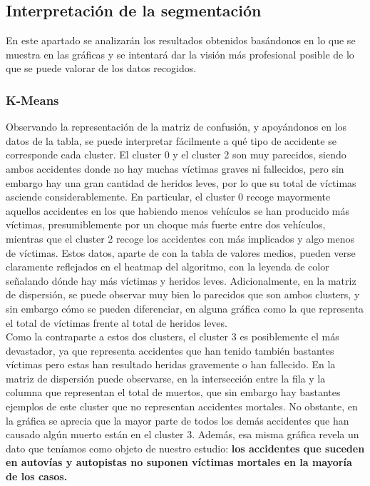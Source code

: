 	\subsection{Interpretación de la segmentación}
	En este apartado se analizarán los resultados obtenidos basándonos en lo que se muestra en las gráficas y se intentará dar la visión más profesional posible de lo que se puede valorar de los datos recogidos.\\
	
	\subsubsection{K-Means}
	Observando la representación de la matriz de confusión, y apoyándonos en los datos de la tabla, se puede interpretar fácilmente a qué tipo de accidente se corresponde cada cluster. El cluster 0 y el cluster 2 son muy parecidos, siendo ambos accidentes donde no hay muchas víctimas graves ni fallecidos, pero sin embargo hay una gran cantidad de heridos leves, por lo que su total de víctimas asciende considerablemente. En particular, el cluster 0 recoge mayormente aquellos accidentes en los que habiendo menos vehículos se han producido más víctimas, presumiblemente por un choque más fuerte entre dos vehículos, mientras que el cluster 2 recoge los accidentes con más implicados y algo menos de víctimas. Estos datos, aparte de con la tabla de valores medios, pueden verse claramente reflejados en el heatmap del algoritmo, con la leyenda de color señalando dónde hay más víctimas y heridos leves. Adicionalmente, en la matriz de dispersión, se puede observar muy bien lo parecidos que son ambos clusters, y sin embargo cómo se pueden diferenciar, en alguna gráfica como la que representa el total de víctimas frente al total de heridos leves.\\
	
	Como la contraparte a estos dos clusters, el cluster 3 es posiblemente el más devastador, ya que representa accidentes que han tenido también bastantes víctimas pero estas han resultado heridas gravemente o han fallecido. En la matriz de dispersión puede observarse, en la intersección entre la fila y la columna que representan el total de muertos, que sin embargo hay bastantes ejemplos de este cluster que no representan accidentes mortales. No obstante, en la gráfica se aprecia que la mayor parte de todos los demás accidentes que han causado algún muerto están en el cluster 3. Además, esa misma gráfica revela un dato que teníamos como objeto de nuestro estudio: \textbf{los accidentes que suceden en autovías y autopistas no suponen víctimas mortales en la mayoría de los casos.}\\
	
